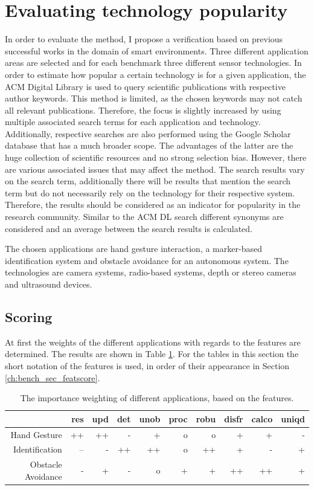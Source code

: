 \section{Evaluating technology popularity}
In order to evaluate the method, I propose a verification based on previous successful works in the domain of smart environments. Three different application areas are selected and for each benchmark three different sensor technologies. In order to estimate how popular a certain technology is for a given application, the ACM Digital Library is used to query scientific publications with respective author keywords. This method is limited, as the chosen keywords may not catch all relevant publications. Therefore, the focus is slightly increased by using multiple associated search terms for each application and technology. Additionally, respective searches are also performed using the Google Scholar database that has a much broader scope. The advantages of the latter are the huge collection of scientific resources and no strong selection bias. However, there are various associated issues that may affect the method. The search results vary on the search term, additionally there will be results that mention the search term but do not necessarily rely on the technology for their respective system. Therefore, the results should be considered as an indicator for popularity in the research community. Similar to the ACM DL search different synonyms are considered and an average between the search results is calculated.

The chosen applications are hand gesture interaction, a marker-based identification system and obstacle avoidance for an autonomous system. The technologies are camera systems, radio-based systems, depth or stereo cameras and ultrasound devices.
\subsection{Scoring}
At first the weights of the different applications with regards to the features are determined. The results are shown in Table \ref{tab:bench_appweights}. For the tables in this section the short notation of the features is used, in order of their appearance in Section \ref{ch:bench_sec_featscore}.

\begin{table}[htbp]
  \centering
  \caption{The importance weighting of different applications, based on the features.}
    \begin{tabular}{rrrrrrrrrr}
    \toprule
          & res   & upd   & det   & unob  & proc  & robu  & disfr & calco & uniqd \\
    \midrule
    Hand Gesture & ++    & ++    & -     & +     & o     & o     & +     & +     & - \\
    Identification & --    & -     & ++    & ++    & o     & ++    & +     & -     & + \\
    Obstacle Avoidance & -     & +     & -     & o     & +     & +     & ++    & ++    & + \\
    \bottomrule
    \end{tabular}%
  \label{tab:bench_appweights}%
\end{table}%


